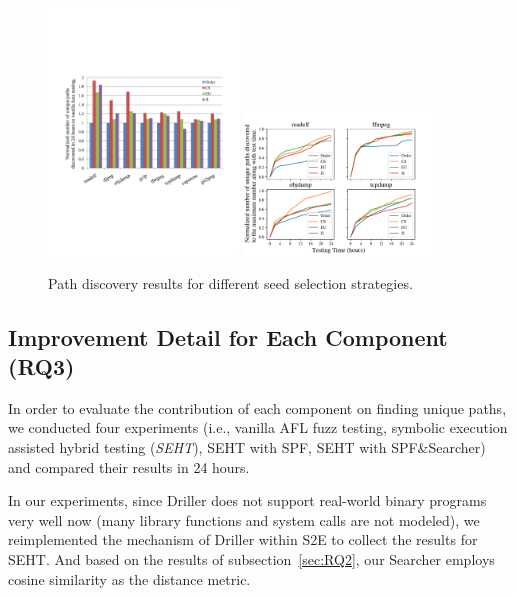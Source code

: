 \begin{figure}[!t]
	\includegraphics[width=0.45\textwidth, trim={0.2cm 0.4cm 0cm 0cm}, clip]{figures/path-discovery.pdf}
	\includegraphics[width=0.45\textwidth, trim={0.15cm 0.1cm 1.5cm 0.8cm}, clip]{figures/path-time-detail.pdf} 
	\label{fig1}
  \caption{Path discovery results for different seed selection strategies.}
  \label{path-detail}
\end{figure} 

\subsection{Improvement Detail for Each Component (RQ3)} \label{sec:RQ3}
In order to evaluate the contribution of each component on finding unique paths, we conducted four experiments (i.e., vanilla AFL fuzz testing, symbolic execution assisted hybrid testing (\textit{SEHT}), SEHT with SPF, SEHT with SPF\&Searcher) and compared their results in 24 hours.

In our experiments, since Driller \cite{stephens2016driller} does not support real-world binary programs very well now (many library functions and system calls are not modeled), we reimplemented the mechanism of Driller within S2E to collect the results for SEHT. 
And based on the results of subsection~\ref{sec:RQ2}, our Searcher employs cosine similarity as the distance metric.

